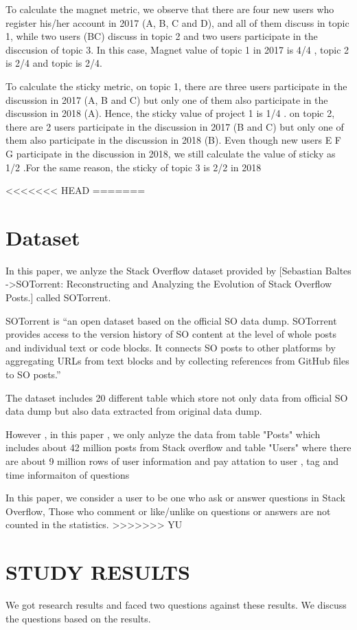 \documentclass[conference]{IEEEtran}
\begin{document}
To calculate the magnet metric, we observe that there are four new users who register his/her account in 2017 (A, B, C and D), and all of them discuss in topic 1, while two users (BC) discuss in topic 2 and two users participate in the disccusion of topic 3. In this case, Magnet value of topic 1 in 2017 is 4/4 , topic 2 is 2/4 and topic is 2/4.

To calculate the sticky metric, on topic 1, there are three users participate in the discussion in 2017 (A, B and C) but only one of them also participate in the discussion in 2018 (A). Hence, the sticky value of project 1 is 1/4 . on topic 2, there are 2 users participate in the discussion in 2017 (B and C) but only one of them also participate in the discussion in 2018 (B). Even though new users E F G participate in the discussion in 2018, we still calculate the value of sticky as 1/2 .For the same reason, the sticky of topic 3 is 2/2 in 2018

<<<<<<< HEAD
=======
\section{Dataset}
In this paper, we anlyze the Stack Overflow dataset provided by [Sebastian Baltes ->SOTorrent: Reconstructing and Analyzing the Evolution of Stack Overflow Posts.] called SOTorrent. 

SOTorrent is “an open dataset based on the official SO data dump. SOTorrent provides access to the version history of SO content at the level of whole posts and individual text or code blocks. It connects SO posts to other platforms by aggregating URLs from text blocks and by collecting references from GitHub files to SO posts.”

The dataset includes 20 different table which store not only data from official SO data dump but also data extracted from original data dump.

However , in this paper , we only anlyze the data from table "Posts" which includes about 42 million posts from Stack overflow and table "Users" where there are about 9 million rows of user information and pay attation to user , tag and time informaiton of questions

In this paper, we consider a user to be one who ask or answer questions in Stack Overflow, Those who comment or like/unlike on questions or answers are not counted in the statistics.
>>>>>>> YU

\section{STUDY RESULTS} %
We got research results and faced two questions against these results. We discuss the questions based on the results.
\end{document}
